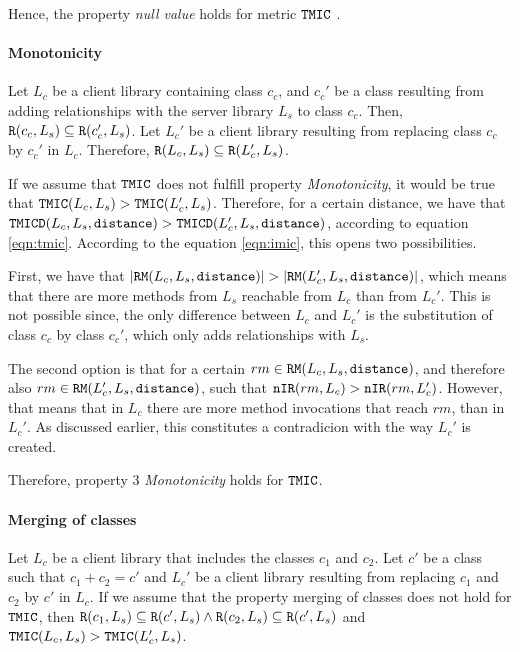 Hence, the property \textit{null value} holds for metric $\verb|TMIC|$ .

\paragraph{Monotonicity}
Let $L_c$ be a client library containing class $c_c$, and $c_c'$ be a class resulting from adding relationships with the server library $L_s$ to class $c_c$. Then, $\verb|R|(c_c, L_s) \subseteq \verb|R|(c_c', L_s)$. Let $L_c'$ be a client library resulting from replacing class $c_c$ by $c_c'$ in $L_c$. Therefore, $\verb|R|(L_c, L_s) \subseteq \verb|R|(L_c', L_s)$.

If we assume that $\verb|TMIC|$ does not fulfill property \textit{Monotonicity}, it would be true that $\verb|TMIC|(L_c, L_s) > \verb|TMIC|(L_c', L_s)$. Therefore, for a certain distance, we have that $\verb|TMICD|(L_c,L_s,\verb|distance|) > \verb|TMICD|(L_c',L_s,\verb|distance|)$, according to equation \ref{eqn:tmic}. According to the equation \ref{eqn:imic}, this opens two possibilities.

First, we have that $|\verb|RM|(L_c,L_s,\verb|distance|)| > |\verb|RM|(L_c',L_s,\verb|distance|)|$, which means that there are more methods from $L_s$ reachable from $L_c$ than from $L_c'$. This is not possible since, the only difference between $L_c$ and $L_c'$ is the substitution of class $c_c$ by class $c_c'$, which only adds relationships with $L_s$.

The second option is that for a certain $rm \in \verb|RM|(L_c,L_s,\verb|distance|)$, and therefore also $rm \in \verb|RM|(L_c',L_s,\verb|distance|)$, such that   $\verb|nIR|(rm,L_c) > \verb|nIR|(rm,L_c')$. However, that means that in $L_c$ there are more method invocations that reach $rm$, than in $L_c'$. As discussed earlier, this constitutes a contradicion with the way $L_c'$ is created.

Therefore, property 3 \textit{Monotonicity} holds for $\verb|TMIC|$.

\paragraph{Merging of classes}
Let $L_c$ be a client library that includes the classes $c_1$ and $c_2$. Let $c'$ be a class such that $c_1 + c_2 = c'$ and $L_c'$ be a client library resulting from replacing $c_1$ and $c_2$ by $c'$ in $L_c$. If we assume that the property merging of classes does not hold for $\verb|TMIC|$, then $\verb|R|(c_1, L_s) \subseteq \verb|R|(c', L_s) \land \verb|R|(c_2, L_s) \subseteq \verb|R|(c', L_s)$ and $\verb|TMIC|(L_c, L_s) > \verb|TMIC|(L_c', L_s)$.

